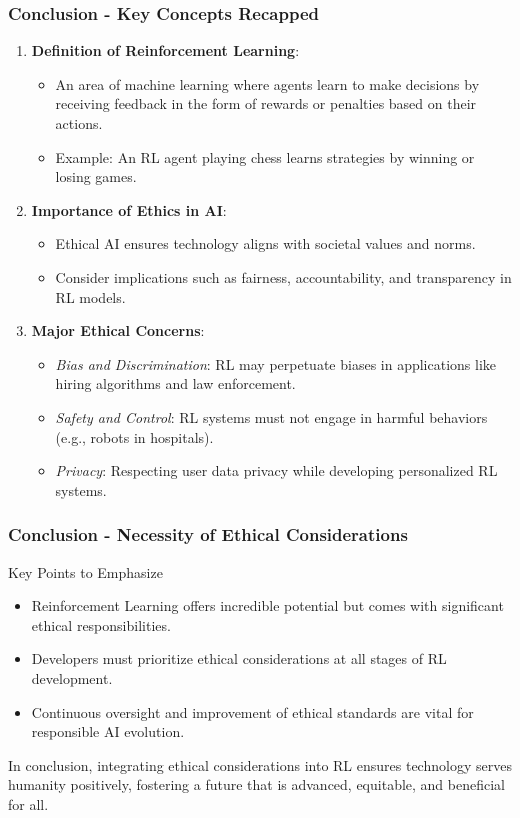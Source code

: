 \documentclass[aspectratio=169]{beamer}
\begin{document}
\begin{frame}[fragile]
    \frametitle{Conclusion - Key Concepts Recapped}

    \begin{enumerate}
        \item \textbf{Definition of Reinforcement Learning}:
        \begin{itemize}
            \item An area of machine learning where agents learn to make decisions by receiving feedback in the form of rewards or penalties based on their actions.
            \item Example: An RL agent playing chess learns strategies by winning or losing games.
        \end{itemize}
        
        \item \textbf{Importance of Ethics in AI}:
        \begin{itemize}
            \item Ethical AI ensures technology aligns with societal values and norms.
            \item Consider implications such as fairness, accountability, and transparency in RL models.
        \end{itemize}

        \item \textbf{Major Ethical Concerns}:
        \begin{itemize}
            \item \textit{Bias and Discrimination}: RL may perpetuate biases in applications like hiring algorithms and law enforcement.
            \item \textit{Safety and Control}: RL systems must not engage in harmful behaviors (e.g., robots in hospitals).
            \item \textit{Privacy}: Respecting user data privacy while developing personalized RL systems.
        \end{itemize}
    \end{enumerate}
\end{frame}

\begin{frame}[fragile]
    \frametitle{Conclusion - Necessity of Ethical Considerations}

    \begin{block}{Key Points to Emphasize}
        \begin{itemize}
            \item Reinforcement Learning offers incredible potential but comes with significant ethical responsibilities.
            \item Developers must prioritize ethical considerations at all stages of RL development.
            \item Continuous oversight and improvement of ethical standards are vital for responsible AI evolution.
        \end{itemize}
    \end{block}

    In conclusion, integrating ethical considerations into RL ensures technology serves humanity positively, fostering a future that is advanced, equitable, and beneficial for all.
\end{frame}
\end{document}
